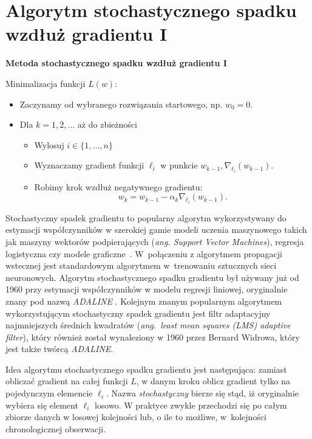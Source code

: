 \section{Algorytm stochastycznego spadku wzdłuż gradientu I}\label{SGD}
\begin{center}
\textbf{Metoda stochastycznego spadku wzdłuż gradientu I}
\end{center}
Minimalizacja funkcji $L(w)$:
\begin{itemize}
\item Zaczynamy od wybranego rozwiązania startowego, np. $w_{0} = 0$.
\item Dla $k = 1, 2, \dots$ aż do zbieżności
	\begin{itemize}
	\item Wylosuj $i \in \{1,\dots,n\}$
	\item Wyznaczamy gradient funkcji $\ell_{i}$ w punkcie $w_{k-1}, \nabla_{\ell_{i}}(w_{k-1})$.
	\item Robimy krok wzdłuż negatywnego gradientu: $$w_{k} = w_{k-1} - \alpha_{k}\nabla_{\ell_{i}}(w_{k-1}).$$
	\end{itemize}
\end{itemize}


Stochastyczny spadek gradientu to popularny algorytm wykorzystywany do estymacji współczynników w szerokiej gamie modeli uczenia maszynowego takich jak maszyny wektorów podpierających (\textit{ang. Support Vector Machines}), regresja logistyczna czy modele graficzne~\cite{finkel}. W~połączeniu z algorytmem propagacji wstecznej jest standardowym algorytmem w~trenowaniu sztucznych sieci neuronowych. Algorytm stochastycznego spadku gradientu był używany już od 1960 przy estymacji współczynników w modelu regresji liniowej, oryginalnie znany pod nazwą \textit{ADALINE} \cite{ADALINE}. Kolejnym znanym popularnym algorytmem wykorzystującym stochastyczny spadek gradientu jest filtr adaptacyjny najmniejszych średnich kwadratów \cite{widrow2} (\textit{ang.~least mean squares (LMS) adaptive filter}), który również został wynaleziony w 1960 przez Bernard Widrowa, który jest także twórcą \textit{ADALINE}.

Idea algorytmu stochastycznego spadku gradientu jest następująca: zamiast obliczać gradient na całej funkcji $L$, w danym kroku oblicz
gradient tylko na pojedynczym elemencie $\ell_{i}$. Nazwa \textit{stochastyczny} bierze się stąd, iż oryginalnie wybiera
się element $\ell_{i}$ losowo. W praktyce zwykle przechodzi się po całym zbiorze danych w losowej kolejności lub, o ile to możliwe, w~kolejności chronologicznej obserwacji.




